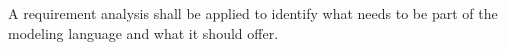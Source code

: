 A requirement analysis shall be applied to identify what needs to be part of the modeling language and what it should offer.